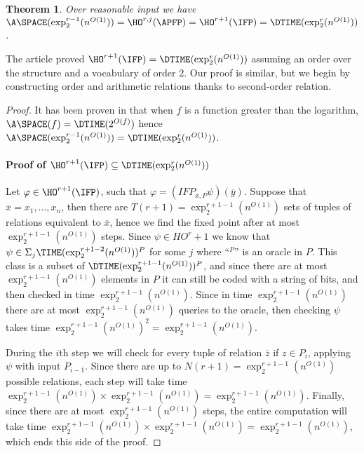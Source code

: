 \documentclass[a4paper,12pt]{article}
\newtheorem{theorem}{Theorem}[section]
\theoremstyle{definition}
\renewcommand{\phi}{\varphi}
\newcommand{\hoa}[1]{\ensuremath{\HO^{#1}}}
\newcommand{\hod}[2]{\ensuremath{\HO^{#1,#2}}}
\newcommand{\ex}[1]{\ensuremath{\exp_{2}^{#1}(n^{O(1)})}}
\newcommand{\ol}{\overline}
\begin{document}
\begin{theorem}\label{tifp}
  Over reasonable input we have $\A\SPACE(\exp^{r-1}_2(n^{O(1)}))=\hod
  rj(\APFP)=\hoa{r+1}(\IFP)=\DTIME(\exp^{r}_2(n^{O(1)}))$.
\end{theorem}

The article \cite{DETH} proved
$\hoa{r+1}(\IFP)=\DTIME(\exp^{r}_2(n^{O(1)}))$ assuming an order over
the structure and a vocabulary of order 2. Our proof is similar, but
we begin by constructing order and arithmetic relations thanks to
second-order relation.

\begin{proof}
  It has been proven in \cite{alternation} that when $f$ is a function
  greater than the logarithm, $\A\SPACE(f)=\DTIME(2^{O(f)})$ hence
  $\A\SPACE(\exp^{r-1}_2(n^{O(1)}))=\DTIME(\exp^{r}_2(n^{O(1)}))$.


 \paragraph{ Proof of
   $\hoa{r+1}(\IFP)\subseteq\DTIME(\exp^{r}_2(n^{O(1)}))$}
 Let $\phi\in\hoa{r+1}(\IFP)$, such that $\phi=(IFP_{\ol x,P}\psi)(\ol
 y)$. Suppose that $\ol x=x_1,\dots,x_n$, then there are
 $T(r+1)=\exp^{r+1-1}_2(n^{O(1)})$ sets of tuples of relations
 equivalent to $\ol x$, hence we find the fixed point after at most
 $\exp^{r+1-1}_2(n^{O(1)})$ steps. Since $\psi\in HO^r+1$ we know that
 $\psi\in\Sigma_{j}\TIME(\ex{r+1-2})^{P}$ for some $j$ where ``$^P$''
 is an oracle in $P$. This class is a subset of
 $\DTIME(\exp_2^{r+1-1}(n^{O(1)}))^P$, and since there are at most
 $\exp^{r+1-1}_2(n^{O(1)})$ elements in $P$ it can still be coded with
 a string of bits, and then checked in time
 $\exp^{r+1-1}_2(n^{O(1)})$. Since in time $\exp^{r+1-1}_2(n^{O(1)})$
 there are at most $\exp^{r+1-1}_2(n^{O(1)})$ queries to the oracle,
 then checking $\psi$ takes time
 $\exp^{r+1-1}_2(n^{O(1)})^2=\exp^{r+1-1}_2(n^{O(1)})$.

  During the $i$th step we will check for every tuple of relation
  $\ol z$ if $z\in P_i$, applying $\psi$ with input
  $P_{i-1}$. Since there are up to $N(r+1)=\exp^{r+1-1}_2(n^{O(1)})$
  possible relations, each step will take time
  $\exp^{r+1-1}_2(n^{O(1)})\times\exp^{r+1-1}_2(n^{O(1)})=\exp^{r+1-1}_2(n^{O(1)})$. Finally,
  since there are at most $\exp^{r+1-1}_2(n^{O(1)})$ steps, the entire
  computation will take time
  $\exp^{r+1-1}_2(n^{O(1)})\times\exp^{r+1-1}_2(n^{O(1)})=\exp^{r+1-1}_2(n^{O(1)})$,
  which ends this side of the proof.



\end{proof}
\end{document}
